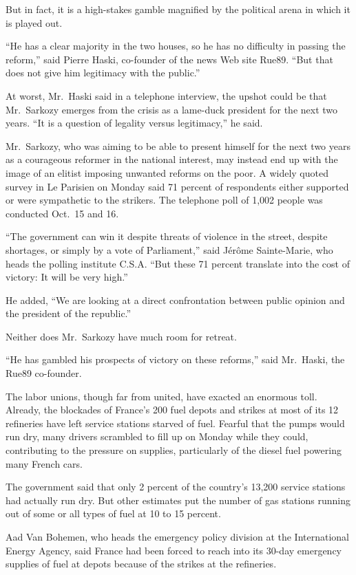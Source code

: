 ﻿\documentclass[12pt]{article}
\begin{document}
But in fact, it is a high-stakes gamble magnified by the political arena in which it is played out.

``He has a clear majority in the two houses, so he has no difficulty in passing the reform,'' said
Pierre Haski, co-founder of the news Web site Rue89. ``But that does not give him legitimacy with
the public.''

At worst, Mr.~Haski said in a telephone interview, the upshot could be that Mr.~Sarkozy emerges from
the crisis as a lame-duck president for the next two years. ``It is a question of legality versus
legitimacy,'' he said.

Mr.~Sarkozy, who was aiming to be able to present himself for the next two years as a courageous
reformer in the national interest, may instead end up with the image of an elitist imposing unwanted
reforms on the poor. A widely quoted survey in Le Parisien on Monday said 71 percent of respondents
either supported or were sympathetic to the strikers. The telephone poll of 1,002 people was
conducted Oct.~15 and 16.

``The government can win it despite threats of violence in the street, despite shortages, or simply
by a vote of Parliament,'' said J\'erôme Sainte-Marie, who heads the polling institute C.S.A. ``But
these 71 percent translate into the cost of victory: It will be very high.''

He added, ``We are looking at a direct confrontation between public opinion and the president of the
republic.''

Neither does Mr.~Sarkozy have much room for retreat.

``He has gambled his prospects of victory on these reforms,'' said Mr.~Haski, the Rue89 co-founder.

The labor unions, though far from united, have exacted an enormous toll. Already, the blockades of
France's 200 fuel depots and strikes at most of its 12 refineries have left service stations starved
of fuel. Fearful that the pumps would run dry, many drivers scrambled to fill up on Monday while
they could, contributing to the pressure on supplies, particularly of the diesel fuel powering many
French cars.

The government said that only 2 percent of the country's 13,200 service stations had actually run
dry. But other estimates put the number of gas stations running out of some or all types of fuel at
10 to 15 percent.

Aad Van Bohemen, who heads the emergency policy division at the International Energy Agency, said
France had been forced to reach into its 30-day emergency supplies of fuel at depots because of the
strikes at the refineries.
\end{document}
